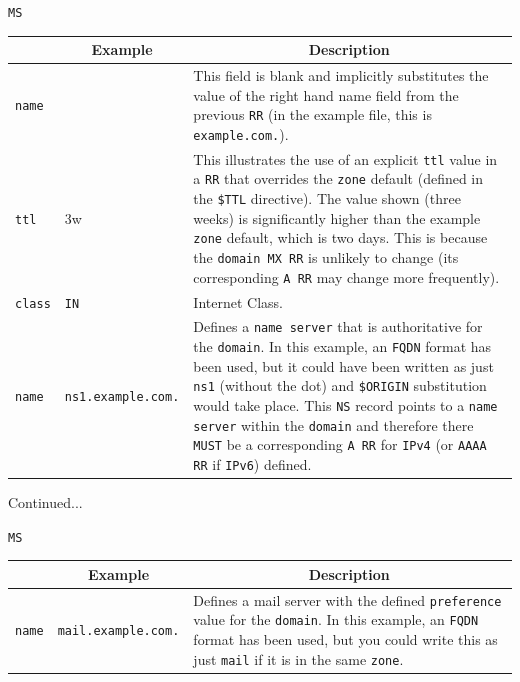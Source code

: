 \documentclass[aspectratio=169,xcolor=table]{beamer}
\begin{document}
\begin{frame}{\texttt{MS}}
  \begin{table}
    \tiny
    \begin{tabular}{|p{1.6cm}|p{1.6cm}|p{5.7cm}|} 
      \hline
      \rowcolor{gray}
      \multicolumn{1}{|c|}{Syntax} & \multicolumn{1}{c|}{Example} & \multicolumn{1}{c|}{Description}\\ 
      \hline
      \texttt{name}&&This field is blank and implicitly substitutes the value of the right hand name field from the previous \texttt{RR} (in the example file, this is \texttt{example.com.}).\\
      \hline
      \texttt{ttl}&3w&This illustrates the use of an explicit \texttt{ttl} value in a \texttt{RR} that overrides the \texttt{zone} default (defined in the \texttt{\$TTL} directive). The value shown (three weeks) is significantly higher than the example \texttt{zone} default, which is two days. This is because the \texttt{domain MX RR} is unlikely to change (its corresponding \texttt{A RR} may change more frequently).\\
      \hline
      \texttt{class}&\texttt{IN}&Internet Class.\\
      \hline
      \texttt{name}&\texttt{ns1.example.com.}&Defines a \texttt{name server} that is authoritative for the \texttt{domain}. In this example, an \texttt{FQDN} format has been used, but it could have been written as just \texttt{ns1} (without the dot) and \texttt{\$ORIGIN} substitution would take place. This \texttt{NS} record points to a \texttt{name server} within the \texttt{domain} and therefore there \texttt{MUST} be a corresponding \texttt{A RR} for \texttt{IPv4} (or \texttt{AAAA RR} if \texttt{IPv6}) defined.\\
      \hline
    \end{tabular}
  \end{table}
  Continued...
\end{frame}

\begin{frame}{\texttt{MS}}
  \begin{table}
    \tiny
    \begin{tabular}{|p{1.6cm}|p{1.7cm}|p{5.7cm}|} 
      \hline
      \rowcolor{gray}
      \multicolumn{1}{|c|}{Syntax} & \multicolumn{1}{c|}{Example} & \multicolumn{1}{c|}{Description}\\ 
      \hline
      \texttt{name}&\texttt{mail.example.com.}&Defines a mail server with the defined \texttt{preference} value for the \texttt{domain}. In this example, an \texttt{FQDN} format has been used, but you could write this as just \texttt{mail} if it is in the same \texttt{zone}.\\
      \hline
    \end{tabular}
  \end{table}
\end{frame}
\end{document}
